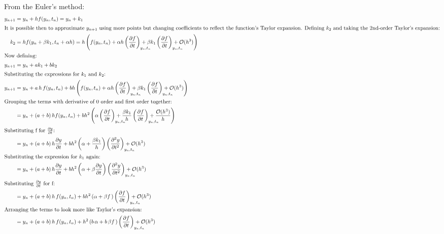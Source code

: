 \documentclass[class={myRUCProject}, crop=false]{standalone}
\begin{document}
From the Euler's method:
\begin{align}
    y_{n+1} &= y_{n} + h f(y_n, t_n) = y_{n} + k_1\\
\intertext{It is possible then to approximate $y_{n+1}$ using more points but changing coefficients to reflect the function's Taylor expansion. Defining $k_2$ and taking the 2nd-order Taylor's expansion:}
    k_2 &= h f(y_n + \beta k_1, t_n + \alpha h) =h \left( f(y_{n}, t_{n}) + \alpha h \left(\frac{\partial f}{\partial t} \right)_{\mathrlap{y_{n},t_{n}}} + \beta k_1 \left(\frac{\partial f}{\partial t} \right)_{\mathrlap{y_{n},t_{n}}}+\clm{O}(h^3) \right)\\
\shortintertext{Now defining:}
     y_{n+1}  &= y_{n} + a k_1 + b k_2\\
\shortintertext{Substituting the expressions for $k_1$ and $k_2$:}
    y_{n+1}  &= y_{n} + a \, h \, f(y_n, t_n) + b h \left( f(y_{n}, t_{n}) + \alpha h \left(\frac{\partial f}{\partial t} \right)_{\mathrlap{y_{n},t_{n}}} + \beta k_1 \left(\frac{\partial f}{\partial t} \right)_{\mathrlap{y_{n},t_{n}}}+ \clm{O}(h^3) \right) \\
\shortintertext{Grouping the terms with derivative of 0 order and first order together:}
    &= y_{n} + (a +b) \, h f(y_n, t_n) + b h^2 \left( \alpha \left(\frac{\partial f}{\partial t} \right)_{\mathrlap{y_{n},t_{n}}} +  \frac{\beta k_1}{h} \left(\frac{\partial f}{\partial t} \right)_{\mathrlap{y_{n},t_{n}}}+  \frac{\clm{O}(h^3)}{h}  \right) \\
\shortintertext{Substituting f for $\frac{\partial y}{\partial t}$:}
    &= y_{n} + (a +b) \, h \frac{\partial y}{\partial t} + b h^2 \left( \alpha  +  \frac{\beta k_1}{h}\right)\left(\frac{\partial^2 y}{\partial t^2} \right)_{\mathrlap{y_{n},t_{n}}}  + \clm{O}(h^3) \\
\shortintertext{Substituting the expression for $k_1$ again:}
    &= y_{n} + (a +b) \, h \frac{\partial y}{\partial t} + b h^2 \left( \alpha  +  \beta \frac{\partial y}{\partial t}\right)\left(\frac{\partial^2 y}{\partial t^2} \right)_{\mathrlap{y_{n},t_{n}}}  + \clm{O}(h^3) \\
\shortintertext{Substituting $\frac{\partial y}{\partial t}$ for f:}
    &=y_{n} + (a +b) \, h \, f(y_n, t_n) + b h^2 \left( \alpha  +  \beta f \, \right)\left(\frac{\partial f}{\partial t} \right)_{\mathrlap{y_{n},t_{n}}}  + \clm{O}(h^3) \\
\shortintertext{Arranging the terms to look more like Taylor's expansion:}
    &=y_{n} + (a +b) \, h \, f(y_n, t_n) +  h^2 \left( b \,\alpha  +  b \, \beta f \, \right)\left(\frac{\partial f}{\partial t} \right)_{\mathrlap{y_{n},t_{n}}}  + \clm{O}(h^3) 
\end{align}
\end{document}
